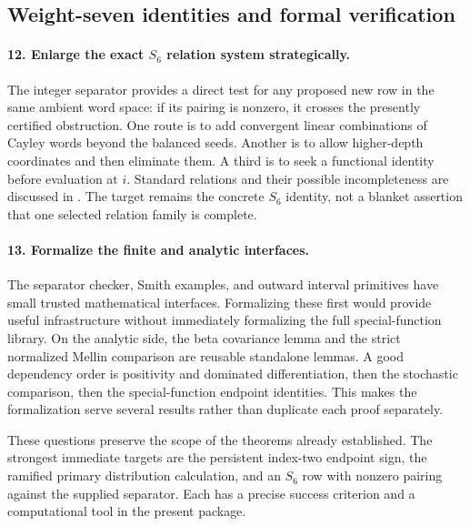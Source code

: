 \subsection{Weight-seven identities and formal verification}

\paragraph{12. Enlarge the exact $S_6$ relation system strategically.}
The integer separator provides a direct test for any proposed new row
in the same ambient word space:
if its pairing is nonzero, it crosses the presently certified
obstruction. One route is to add convergent linear combinations of
Cayley words beyond the balanced seeds. Another is to allow
higher-depth coordinates and then eliminate them. A third is to seek
a functional identity before evaluation at $i$. Standard relations
and their possible incompleteness are discussed in \cite{zhao,racinet}.
The target remains the concrete $S_6$ identity, not a blanket assertion
that one selected relation family is complete.

\paragraph{13. Formalize the finite and analytic interfaces.}
The separator checker, Smith examples, and outward interval primitives
have small trusted mathematical interfaces. Formalizing these first
would provide useful infrastructure without immediately formalizing
the full special-function library. On the analytic side, the beta
covariance lemma and the strict normalized Mellin comparison are
reusable standalone lemmas. A good dependency order is positivity and
dominated differentiation, then the stochastic comparison, then the
special-function endpoint identities. This makes the formalization
serve several results rather than duplicate each proof separately.

These questions preserve the scope of the theorems already established.
The strongest immediate targets are the persistent index-two endpoint
sign, the ramified primary distribution calculation, and an $S_6$ row
with nonzero pairing against the supplied separator. Each has a precise
success criterion and a computational tool in the present package.
